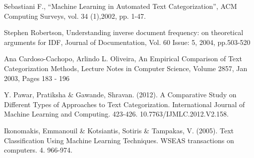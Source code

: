 \documentclass[10pt,journal,compsoc]{IEEEtran}
\begin{document}
\begin{thebibliography}{1}
	
	 Sebastiani F., “Machine Learning in
	Automated Text Categorization”, ACM
	Computing Surveys, vol. 34 (1),2002, pp. 1-47.
	
	Stephen Robertson, 
	Understanding inverse document frequency: 
	on theoretical arguments for IDF, Journal 
	of Documentation, Vol. 60 Issue: 5, 
	2004, pp.503-520
	
	Ana Cardoso-Cachopo, Arlindo L. Oliveira, An
	Empirical Comparison of Text Categorization
	Methods, Lecture Notes in Computer Science,
	Volume 2857, Jan 2003, Pages 183 - 196
	
	Y. Pawar, Pratiksha \& Gawande, Shravan. (2012). 
	A Comparative Study on Different Types of Approaches 
	to Text Categorization. 
	International Journal of Machine Learning and Computing. 
	423-426. 10.7763/IJMLC.2012.V2.158.
	
	Ikonomakis, Emmanouil \& Kotsiantis, Sotiris \& 
	Tampakas, V. (2005). Text Classification Using Machine Learning 
	Techniques. WSEAS transactions on computers. 4. 966-974. 
\end{thebibliography}


%
\end{document}
